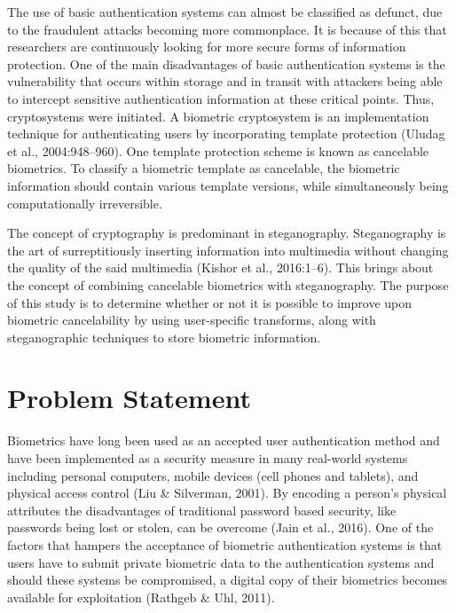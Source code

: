 The use of basic authentication systems can almost be classified as defunct, due to the fraudulent attacks becoming more commonplace. It is because of this that researchers are continuously looking for more secure forms of information protection. One of the main disadvantages of basic authentication systems is the vulnerability that occurs within storage and in transit with attackers being able to intercept sensitive authentication information at these critical points. Thus, cryptosystems were initiated. A biometric cryptosystem is an implementation technique for authenticating users by incorporating template protection (Uludag et al., 2004:948–960). One template protection scheme is known as cancelable biometrics. To classify a biometric template as cancelable, the biometric information should contain various template versions, while simultaneously being computationally irreversible. 

The concept of cryptography is predominant in steganography. Steganography is the art of surreptitiously inserting information into multimedia without changing the quality of the said multimedia (Kishor et al., 2016:1–6). This brings about the concept of combining cancelable biometrics with steganography.
The purpose of this study is to determine whether or not it is possible to improve upon biometric cancelability by using user-specific transforms, along with steganographic techniques to store biometric information.




\section{Problem Statement} %


Biometrics have long been used as an accepted user authentication method and have been implemented as a security measure in many real-world systems including personal computers, mobile devices (cell phones and tablets), and physical access control (Liu \& Silverman, 2001). By encoding a person’s physical attributes the disadvantages of traditional password based security, like passwords being lost or stolen, can be overcome (Jain et al., 2016). One of the factors that hampers the acceptance of biometric authentication systems is that users have to submit private biometric data to the authentication systems and should these systems be compromised, a digital copy of their biometrics becomes available for exploitation (Rathgeb & Uhl, 2011).

